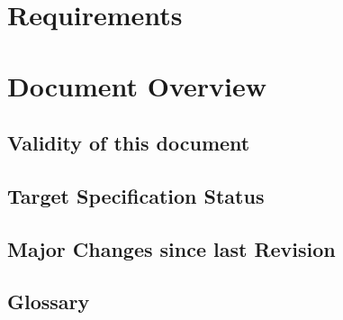 
\chapter{Requirements}


\chapter{Document Overview}

\section{Validity of this document}

\section{Target Specification Status}

\section{Major Changes since last Revision}

\tableofcontents
\listoffigures
\listoftables
\section{Glossary}

